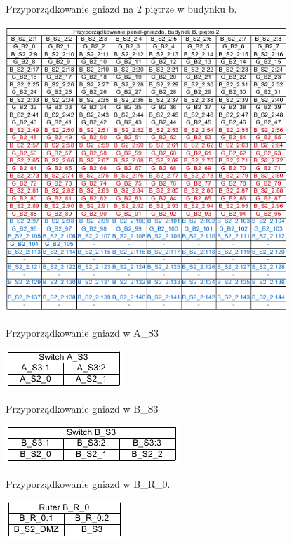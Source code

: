 \documentclass{report}
\begin{document}
\begin{table}[H]
\caption{Przyporządkowanie gniazd na 2 piętrze w budynku b.}
 \centering
      \includegraphics[width=0.8\textwidth]{./obrazki/tab_kros/b2.png}
\end{table}

\begin{table}[H]
\caption{Przyporządkowanie gniazd w A\_S3}
 \centering
      \includegraphics{./obrazki/tab_kros/as3.png}
\end{table}

\begin{table}[H]
\caption{Przyporządkowanie gniazd w B\_S3}
 \centering
      \includegraphics{./obrazki/tab_kros/bs3.png}
\end{table}

\begin{table}[H]
\caption{Przyporządkowanie gniazd w B\_R\_0.}
 \centering
      \includegraphics{./obrazki/tab_kros/br0.png}
\end{table}
\end{document}
